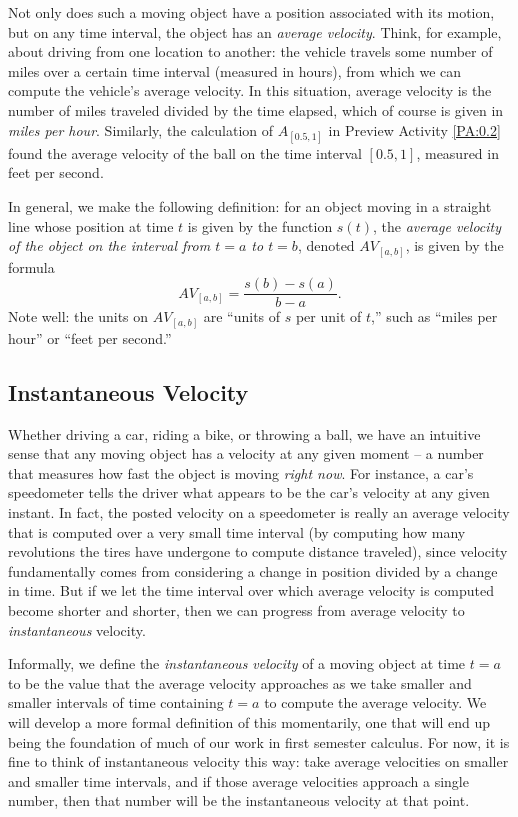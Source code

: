 Not only does such a moving object have a position associated with its motion, but on any time interval, the object has an \emph{average velocity}.   Think, for example, about driving from one location to another:  the vehicle travels some number of miles over a certain time interval (measured in hours), from which we can compute the vehicle's average velocity.  In this situation, average velocity is the number of miles traveled divided by the time elapsed, which of course is given in \emph{miles per hour}. Similarly, the calculation of $A_{[0.5,1]}$ in Preview Activity \ref{PA:0.2} found the average velocity of the ball on the time interval $[0.5,1]$, measured in feet per second.

In general, we make the following definition:  for an object moving in a straight line whose position at time $t$ is given by the function $s(t)$, the \emph{average velocity of the object on the interval from $t = a$ to $t = b$}, denoted $AV_{[a,b]}$, is given by the formula
\[ AV_{[a,b]} = \frac{s(b)-s(a)}{b-a}. \]
Note well: the units on $AV_{[a,b]}$ are 
``units of $s$ per unit of $t$,'' such as ``miles per hour'' or ``feet per second.''


\subsection*{Instantaneous Velocity}

Whether driving a car, riding a bike, or throwing a ball, we have an intuitive sense that any moving object has a velocity at any given moment -- a number that measures how fast the object is moving \emph{right now}.  For instance, a car's speedometer tells the driver what appears to be the car's velocity at any given instant.  In fact, the posted velocity on a speedometer is really an average velocity that is computed over a very small time interval (by computing how many revolutions the tires have undergone to compute distance traveled), since velocity fundamentally comes from considering a change in position divided by a change in time.  But if we let the time interval over which average velocity is computed become shorter and shorter, then we can progress from average velocity to \emph{instantaneous} velocity.  

Informally, we define the \emph{instantaneous velocity} of a moving object at time $t = a$ to be the value that the average velocity approaches as we take smaller and smaller intervals of time containing $t = a$ to compute the average velocity.  We will develop a more formal definition of this momentarily, one that will end up being the foundation of much of our work in first semester calculus.  For now, it is fine to think of instantaneous velocity this way:  take average velocities on smaller and smaller time intervals, and if those average velocities approach a single number, then that number will be the instantaneous velocity at that point.

